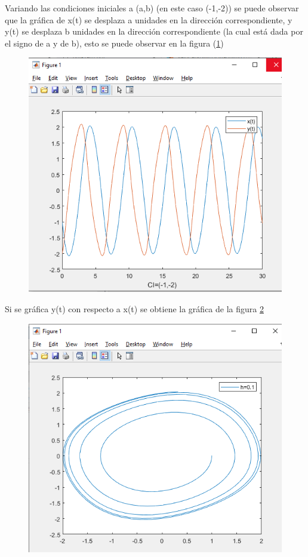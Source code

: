 \documentclass[12pt]{article}
\begin{document}
Variando las condiciones iniciales a (a,b) (en este caso (-1,-2)) se puede observar que la gráfica de x(t) se desplaza a unidades en la dirección correspondiente, y y(t) se desplaza b unidades en la dirección correspondiente (la cual está dada por el signo de a y de b), esto se puede observar en la figura (\ref{graf8})
\begin{figure}[h]
	\centering
	\caption{}
	\includegraphics[scale=0.45]{graf8.png}
	\label{graf8}
\end{figure}
\newpage
Si se gráfica y(t) con respecto a x(t) se obtiene la gráfica de la figura \ref{graf9}
\begin{figure}[h]
\centering
\caption{}
\includegraphics[scale=0.45]{graf9.png}
\label{graf9}
\end{figure}\\
\end{document}

